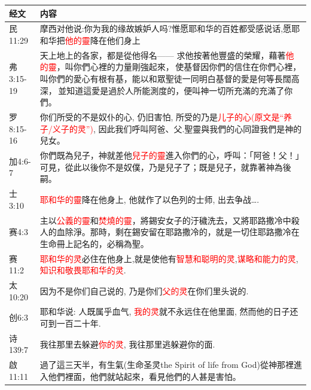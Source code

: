 \begin{table}[H]
\centering
\begin{tabular}{p{5em}|p{44em}}  \toprule
经文&内容\\  \midrule

民11:29&摩西对他说:你为我的缘故嫉妒人吗?惟愿耶和华的百姓都受感说话,愿耶和华把\textcolor{red}{他的靈}降在他们身上\\  \midrule

弗3:15-19&天上地上的各家，都是從他得名—— 求他按著他豐盛的榮耀，藉著\textcolor{red}{他的靈}，叫你們心裡的力量剛強起來， 使基督因你們的信住在你們心裡，叫你們的愛心有根有基，能以和眾聖徒一同明白基督的愛是何等長闊高深， 並知道這愛是過於人所能測度的，便叫神一切所充滿的充滿了你們。\\  \midrule

罗8:15-16&你们所受的不是奴仆的心, 仍旧害怕, 所受的乃是\textcolor{red}{儿子的心(原文是“养子/义子的灵”)}, 因此我们呼叫阿爸、父.聖靈與我們的心同證我們是神的兒女。 \\  \midrule

加4:6-7&你們既為兒子，神就差他\textcolor{red}{兒子的靈}進入你們的心，呼叫：「阿爸！父！」可見，從此以後你不是奴僕，乃是兒子了；既是兒子，就靠著神為後嗣。\\  \midrule

士3:10&\textcolor{red}{耶和华的靈}降在他身上, 他就作了以色列的士师, 出去争战….\\  \midrule
赛4:3&主以\textcolor{red}{公義的靈}和\textcolor{red}{焚燒的靈}，將錫安女子的汙穢洗去，又將耶路撒冷中殺人的血除淨。那時，剩在錫安留在耶路撒冷的，就是一切住耶路撒冷在生命冊上記名的，必稱為聖。\\  \midrule
赛11:2&\textcolor{red}{耶和华的灵}必住在他身上,就是使他有\textcolor{red}{智慧和聪明的灵},\textcolor{red}{谋略和能力的灵},\textcolor{red}{知识和敬畏耶和华的灵}.\\  \midrule

太10:20&因为不是你们自己说的, 乃是你们\textcolor{red}{父的灵}在你们里头说的.\\  \midrule

创6:3&耶和华说: 人既属乎血气, \textcolor{red}{我的灵}就不永远住在他里面, 然而他的日子还可到一百二十年.\\  \midrule
诗139:7&我往那里去躲避\textcolor{red}{你的灵}, 我往那里逃躲避你的面.\\  \midrule

啟11:11&過了這三天半，有生氣(生命圣灵the Spirit of life from God)從神那裡進入他們裡面，他們就站起來，看見他們的人甚是害怕。\\  \midrule


\end{tabular}
\end{table}
